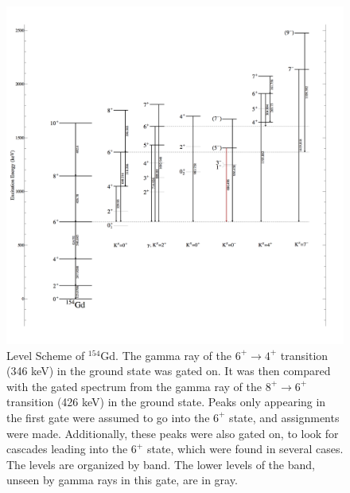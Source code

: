 \begin{figure}
    \centering
    \includegraphics[scale=0.2]{154GdTablesAndFigs/154Gd_6to4.png}
    \caption{Level Scheme of $^{154}$Gd. The gamma ray of the $6^+\rightarrow4^+$ transition (346 keV) in the ground state was gated on. It was then compared with the gated spectrum from the gamma ray of the $8^+\rightarrow6^+$ transition (426 keV) in the ground state. Peaks only appearing in the first gate were assumed to go into the $6^+$ state, and assignments were made. Additionally, these peaks were also gated on, to look for cascades leading into the $6^+$ state, which were found in several cases. The levels are organized by band. The lower levels of the band, unseen by gamma rays in this gate, are in gray.}
    \label{fig:154_6to4}
\end{figure}